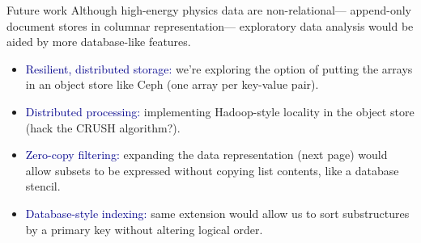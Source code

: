 \documentclass[aspectratio=169]{beamer}
\begin{document}

\begin{frame}{Future work}
\vspace{0.35 cm}
\large
Although high-energy physics data are non-relational--- append-only document stores in columnar representation--- exploratory data analysis would be aided by more database-like features.

\begin{itemize}\setlength{\itemsep}{0.2 cm}
\item<2-> \textcolor{darkblue}{Resilient, distributed storage:} we're exploring the option of putting the arrays in an object store like Ceph (one array per key-value pair).
\item<3-> \textcolor{darkblue}{Distributed processing:} implementing Hadoop-style locality in the object store (hack the CRUSH algorithm?).
\item<4-> \textcolor{darkblue}{Zero-copy filtering:} expanding the data representation (next page) would allow subsets to be expressed without copying list contents, like a database stencil.
\item<5-> \textcolor{darkblue}{Database-style indexing:} same extension would allow us to sort substructures by a primary key without altering logical order.
\end{itemize}
\end{frame}
\end{document}
